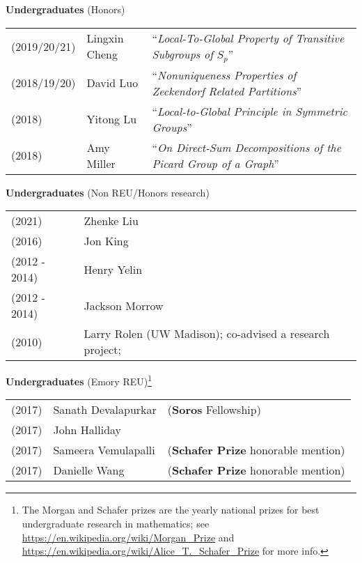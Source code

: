 \documentclass[margin,line]{res}
\newcommand{\defi}[1]{\textsf{#1}} 				%
\begin{document}
\begin{resume}
\begin{tabular}{lll}
\end{tabular}




{\bf Undergraduates} (Honors)
\vspace*{-.15in}

\begin{tabular}{lll}
  (2019/20/21) & \defi{Lingxin Cheng} & ``\emph{Local-To-Global Property of Transitive Subgroups of} $S_p$''\\
  (2018/19/20) & \defi{David Luo} & ``\emph{Nonuniqueness Properties of Zeckendorf Related Partitions}'' \\
  (2018) & \defi{Yitong Lu} & ``\emph{Local-to-Global Principle in Symmetric Groups}'' \\
  (2018) & \defi{Amy Miller} & ``\emph{On Direct-Sum Decompositions of the Picard Group of a Graph}''
\end{tabular}

{\bf Undergraduates} (Non REU/Honors research)
\vspace*{-.15in}

\begin{tabular}{ll}
 (2021) & \defi{Zhenke Liu} \\
 (2016) & \defi{Jon King} \\  
 (2012 - 2014) & \defi{Henry Yelin} \\
 (2012 - 2014) & \defi{Jackson Morrow} \\
 (2010) &  \defi{Larry Rolen} (UW Madison); co-advised a research project; \\
\end{tabular}


{\bf Undergraduates} (Emory REU)\footnote{The Morgan and Schafer prizes are the yearly national prizes for best undergraduate research in mathematics; see \url{https://en.wikipedia.org/wiki/Morgan_Prize} and \url{https://en.wikipedia.org/wiki/Alice_T._Schafer_Prize} for more info.}
\vspace*{-.15in}

\begin{tabular}{lll}

(2017) & Sanath Devalapurkar  & (\textbf{Soros} Fellowship) \\
(2017) & John Halliday & \\
(2017) &  Sameera Vemulapalli & (\textbf{Schafer Prize} honorable mention)  \\
(2017) & Danielle Wang & (\textbf{Schafer Prize} honorable mention)  \\


\end{tabular}
\end{resume}
\end{document}
